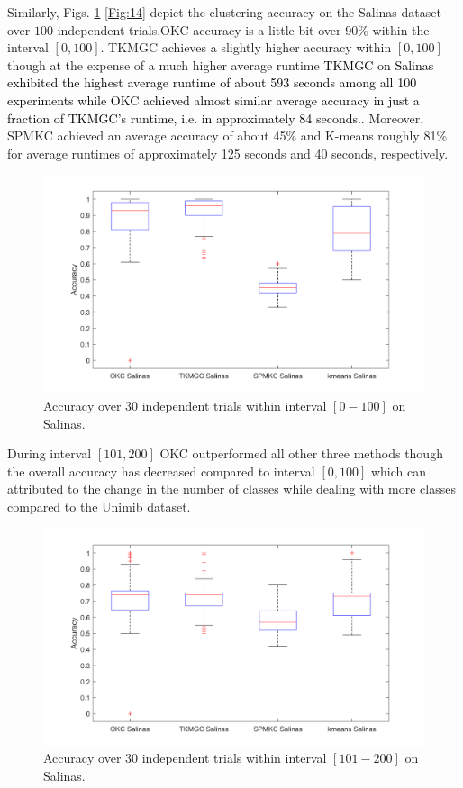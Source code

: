 \documentclass[10pt,final]{IEEEtran}
\begin{document}
Similarly, Figs. \ref{Fig:12}-\ref{Fig:14} depict the clustering accuracy on the  Salinas dataset over $100$ independent trials.OKC accuracy is a little bit over 90\% within the interval $[0,100]$. TKMGC achieves a slightly higher accuracy within $[0,100]$ though at the expense of a much higher average runtime  \textcolor{black}{TKMGC on Salinas exhibited the highest average runtime of about 593 seconds among all 100 experiments while OKC achieved almost similar average accuracy in just a fraction of TKMGC's runtime, i.e. in approximately 84 seconds.}. Moreover, SPMKC achieved an average accuracy of about 45\% and K-means roughly 81\% for average runtimes of approximately 125 seconds and 40 seconds, respectively.
\begin{figure}[htp]
    \centering
    \includegraphics[scale=0.18]{boxplot_4_methods_Salinas_0-100.png}
    \caption{Accuracy over 30 independent trials within interval $[0-100]$ on Salinas.}
    \label{Fig:12}
\end{figure}
During interval $[101, 200]$ OKC outperformed all other three methods though the overall accuracy has decreased compared to interval $[0,100]$ which can attributed to the change in the number of classes while dealing with more classes compared to the Unimib dataset.
\begin{figure}[htp]
    \centering
    \includegraphics[scale=0.18]{boxplot_4_methods_Salinas_101-200.png}
    \caption{Accuracy over 30 independent trials within interval $[101-200]$ on Salinas.}
    \label{Fig:13}
\end{figure}
\end{document}
